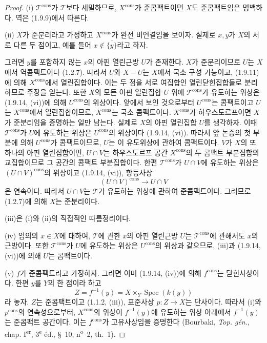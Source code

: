 \begin{proof}
(i) $\mathscr T^{\mathrm{cons}}$가 $\mathscr T$보다 세밀하므로,
$X^{\mathrm{cons}}$가 준콤팩트이면 $X$도 준콤팩트임은 명백하다. 역은
(1.9.9)에서 따른다.

(ii) $X$가 준분리라고 가정하고 $X^{\mathrm{cons}}$가 완전 비연결임을
보이자. 실제로 $x,y$가 $X$의 서로 다른 두 점이고, 예를 들어
$x\notin\overline{\{y\}}$라고 하자.


그러면 $y$를 포함하지 않는 $x$의 아핀 열린근방 $U$가 존재한다.
$X$가 준분리이므로 $U$는 $X$에서 역콤팩트이다 (1.2.7). 따라서
$U$와 $X-U$는 $X$에서 국소 구성 가능이고, (1.9.11)에 의해
$X^{\mathrm{cons}}$에서 열린집합이다. 이는 두 점을 서로 여집합인
열린닫힌집합들로 분리하므로 주장을 얻는다. 또한 $X$의 모든 아핀
열린집합 $U$ 위에 $\mathscr T^{\mathrm{cons}}$가 유도하는 위상은
(1.9.14, (vi))에 의해 $U^{\mathrm{cons}}$의 위상이다. 앞에서 보인
것으로부터 $U^{\mathrm{cons}}$는 콤팩트이고 $U$는
$X^{\mathrm{cons}}$에서 열린집합이므로, $X^{\mathrm{cons}}$는 국소
콤팩트이다.
$X^{\mathrm{cons}}$가 하우스도르프이면 $X$가 준분리임을 증명하는
일만 남는다. 실제로 $X$의 아핀 열린집합 $U$를 생각하자. 이때
$\mathscr T^{\mathrm{cons}}$가 $U$에 유도하는 위상은
$U^{\mathrm{cons}}$의 위상이다 (1.9.14, (vi)). 따라서 앞 논증의 첫
부분에 의해 $U^{\mathrm{cons}}$가 콤팩트이므로, $U$는 이 유도위상에
관하여 콤팩트이다. $V$가 $X$의 또 하나의 아핀 열린집합이면,
$U\cap V$는 하우스도르프 공간 $X^{\mathrm{cons}}$의 두 콤팩트
부분집합의 교집합이므로 그 공간의 콤팩트 부분집합이다. 한편
$\mathscr T^{\mathrm{cons}}$가 $U\cap V$에 유도하는 위상은
$(U\cap V)^{\mathrm{cons}}$의 위상이고 (1.9.14, (vi)), 항등사상
\[
  (U\cap V)^{\mathrm{cons}}\longrightarrow U\cap V
\]
은 연속이다. 따라서 $U\cap V$는 $\mathscr T$가 유도하는 위상에
관하여 준콤팩트이다. 그러므로 (1.2.7)에 의해 $X$는 준분리이다.

(iii)은 (i)와 (ii)의 직접적인 따름정리이다.

(iv) 임의의 $x\in X$에 대하여, $\mathscr T$에 관한 $x$의 아핀
열린근방 $U$는 $\mathscr T^{\mathrm{cons}}$에 관해서도 $x$의
근방이다. 또한 $\mathscr T^{\mathrm{cons}}$가 $U$에 유도하는 위상은
$U^{\mathrm{cons}}$의 위상과 같으므로, (iii)과 (1.9.14, (vi))에
의해 $U$는 콤팩트이다.

(v) $f$가 준콤팩트라고 가정하자. 그러면 이미 (1.9.14, (iv))에 의해
$f^{\mathrm{cons}}$는 닫힌사상이다. 한편 $y$를 $Y$의 한 점이라 하고
\[
  Z=f^{-1}(y)=X\times_Y\operatorname{Spec}(k(y))
\]
라 놓자. $Z$는 준콤팩트이고 (1.1.2, (iii)), 표준사상
$p:Z\to X$는 단사이다. 따라서 (i)와 $p^{\mathrm{cons}}$의 연속성으로부터,
$X^{\mathrm{cons}}$의 위상이 $f^{-1}(y)$에 유도하는 위상 아래에서
$f^{-1}(y)$는 준콤팩트 공간이다. 이는 $f^{\mathrm{cons}}$가
고유사상임을 증명한다 (Bourbaki, \emph{Top. gén.}, chap.
I\textsuperscript{er}, 3\textsuperscript{e} éd., \S~10,
n\textsuperscript{o}~2, th.~1).


\end{proof}
